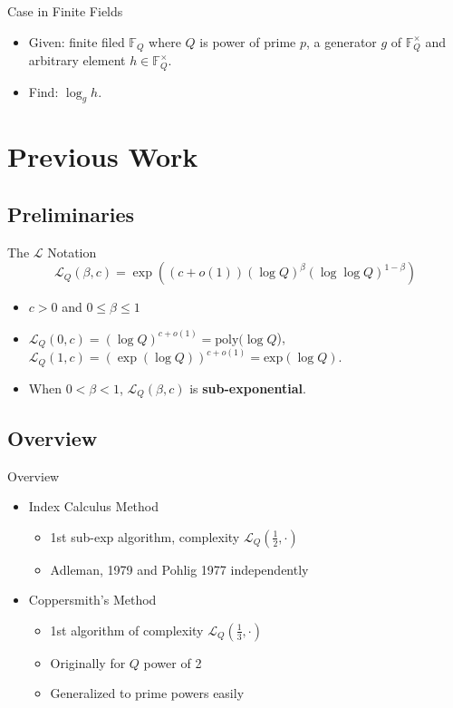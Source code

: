 \documentclass{beamer}
\begin{document}
		\begin{frame}{Case in Finite Fields}
			\begin{itemize}
				\item
					Given: finite filed $\mathbb{F}_Q$ where $Q$ is power of prime $p$,
					a generator $g$ of $\mathbb{F}_Q^\times$ and arbitrary element $h\in\mathbb{F}_Q^\times$.
				\item
					Find: $\log_gh$.
			\end{itemize}
		\end{frame}

\section{Previous Work}

	\subsection{Preliminaries}
		\begin{frame}{The $\mathcal{L}$ Notation}
			$$\mathcal{L}_Q(\beta, c) = \exp((c + o(1))(\log Q)^\beta (\log\log Q)^{1-\beta})$$
			\begin{itemize}
				\item 
					$c>0$ and $0 \le \beta \le 1$
				\item
					$\mathcal{L}_Q(0, c) = (\log Q)^{c + o(1)} = \text{poly}(\log Q$),\\
					$\mathcal{L}_Q(1, c) = (\exp(\log Q))^{c+o(1)} = \text{exp}(\log Q)$. 
				\item
					When $0<\beta<1$, $\mathcal{L}_Q(\beta, c)$ is \textbf{sub-exponential}.
			\end{itemize}
		\end{frame}
	
	\subsection{Overview}		
		\begin{frame}{Overview}
			\begin{itemize}
				\item
					Index Calculus Method
						\begin{itemize}
							\item
								1st sub-exp algorithm, complexity $\mathcal{L}_Q(\frac{1}{2}, \cdot)$
							\item
								Adleman, 1979 and Pohlig 1977 independently
						\end{itemize}
				\item
					Coppersmith's Method
						\begin{itemize}
							\item
								1st algorithm of complexity $\mathcal{L}_Q(\frac{1}{3}, \cdot)$
							\item
								Originally for $Q$ power of 2
							\item
								Generalized to prime powers easily %
						\end{itemize}
			\end{itemize}
		\end{frame}
		
\end{document}
